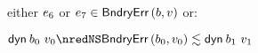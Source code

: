 {\begin{lamportproof*}
\begin{pfproof}
\begin{pfproof}
\begin{pfproof}
            \end{pfproof}
          \qedstep
            \begin{pfproof}
              either $\sexpr_6$ or $\sexpr_7 \in \boundaryerror{\sbnd}{\svalue}$ or:
              \begin{mathpar}
              \end{mathpar}
            \end{pfproof}
        \end{pfproof}
        \begin{pfproof}
          \qedstep
            \begin{pfproof}
              $\edynb{\sbnd_0}{\svalue_0} \nredNS \rexpr{\boundaryerror{\sbnd_0}{\svalue_0}}{\edynb{\sbnd_1}{\svalue_1}}$
            \end{pfproof}
        \end{pfproof}
    \end{pfproof}


\end{lamportproof*}}
